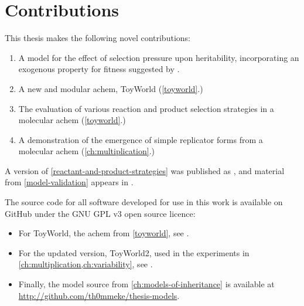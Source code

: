 \section{Contributions}\label{contributions}

This thesis makes the following novel contributions:

\begin{enumerate}
\item A model for the effect of selection pressure upon heritability, incorporating an exogenous property for fitness suggested by \textcite{Bourrat2015}.
\item A new and modular \gls{achem}, ToyWorld (\cref{toyworld}.)
\item The evaluation of various reaction and product selection strategies in a molecular \gls{achem} (\cref{toyworld}.)
\item A demonstration of the emergence of simple replicator forms from a molecular \gls{achem} (\cref{ch:multiplication}.)
\end{enumerate}

A version of \cref{reactant-and-product-strategies} was published as \textcite{Young2015}, and material from \cref{model-validation} appears in \textcite{Young2013}.

The source code for all software developed for use in this work is available on GitHub under the GNU GPL v3 open source licence:
\begin{itemize}
	\item For ToyWorld, the \gls{achem} from \cref{toyworld}, see \cite{toyworld}.
	\item For the updated version, ToyWorld2, used in the experiments in \cref{ch:multiplication,ch:variability}, see \cite{toyworld2}.
	\item Finally, the model source from \cref{ch:models-of-inheritance} is available at \url{http://github.com/th0mmeke/thesis-models}. 
\end{itemize}




